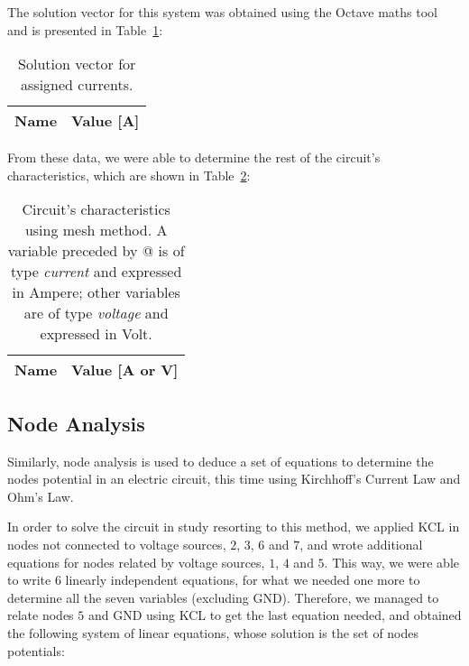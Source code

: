 \vspace{1mm}

The solution vector for this system was obtained using the Octave maths tool and is presented in Table~\ref{tab:meshvec}:

\begin{table}[H]
  \centering
  \begin{tabular}{|l|r|}
    \hline    
    {\bf Name} & {\bf Value [A]} \\ \hline
    
  \end{tabular}
  \caption{Solution vector for assigned currents.}
  \label{tab:meshvec}
\end{table}

From these data, we were able to determine the rest of the circuit's characteristics, which are shown in Table~\ref{tab:meshtab}:

\begin{table}[H]
  \centering
  \begin{tabular}{|l|r|}
    \hline    
    {\bf Name} & {\bf Value [A or V]} \\ \hline
    
  \end{tabular}
  \caption{Circuit's characteristics using mesh method. A variable preceded by @ is of type {\em current}
    and expressed in Ampere; other variables are of type {\it voltage} and expressed in
    Volt.}
  \label{tab:meshtab}
\end{table}


\subsection{Node Analysis}

Similarly, node analysis is used to deduce a set of equations to determine the nodes potential in an electric circuit, this time using Kirchhoff’s Current Law and Ohm's Law.

In order to solve the circuit in study resorting to this method, we applied KCL in nodes not connected to voltage sources, $2$, $3$, $6$ and $7$, and wrote additional equations for nodes related by voltage sources, $1$, $4$ and $5$. This way, we were able to write 6 linearly independent equations, for what we needed one more to determine all the seven variables (excluding GND). Therefore, we managed to relate nodes $5$ and GND using KCL to get the last equation needed, and obtained the following system of linear equations, whose solution is the set of nodes potentials:

